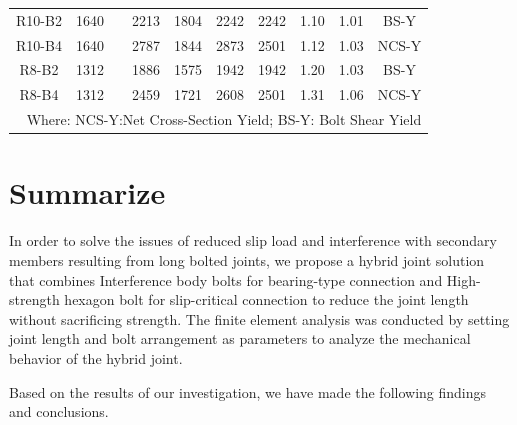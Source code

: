 \begin{table}[htbp]
{\begin{tabular}{@{}cccccccccc@{}}
R10-B2    & 1640 &                       & 2213 & 1804 & 2242 & 2242 & 1.10 & 1.01 & BS-Y    \\
R10-B4    & 1640 &                       & 2787 & 1844 & 2873 & 2501 & 1.12 & 1.03 & NCS-Y \\
R8-B2     & 1312 &                       & 1886 & 1575 & 1942 & 1942 & 1.20 & 1.03 & BS-Y    \\
R8-B4     & 1312 &                       & 2459 & 1721 & 2608 & 2501 & 1.31 & 1.06 & NCS-Y \\ \bottomrule
\multicolumn{10}{r}{Where: NCS-Y:Net Cross-Section Yield; BS-Y: Bolt Shear Yield}
\end{tabular}}
\end{table}



\section{Summarize}

In order to solve the issues of reduced slip load and interference with secondary members resulting from long bolted joints, we propose a hybrid joint solution that combines Interference body bolts for bearing-type connection and High-strength hexagon bolt for slip-critical connection to reduce the joint length without sacrificing strength. The finite element analysis was conducted by setting joint length and bolt arrangement as parameters to analyze the mechanical behavior of the hybrid joint. 

Based on the results of our investigation, we have made the following findings and conclusions. \par

